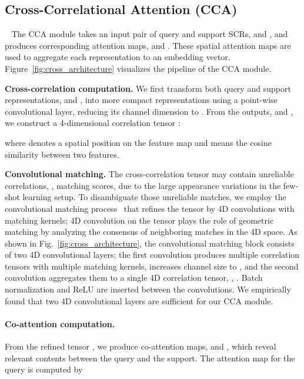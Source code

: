 \documentclass[10pt,twocolumn,letterpaper]{article}
\newcommand{\abbcross}{CCA\xspace}
\newcommand{\smallbreakparagraph}[1]{\smallbreak \noindent \textbf{#1}}
\begin{document}
\subsection{Cross-Correlational Attention (\abbcross)}~\label{sec_CCA}
The \abbcross module takes an input pair of query and support SCRs,  and , and produces corresponding attention maps,  and .
These spatial attention maps are used to aggregate each representation to an embedding vector.
Figure~\ref{fig:cross_architecture} visualizes the pipeline of the \abbcross module.








\smallbreakparagraph{Cross-correlation computation.}
We first transform both query and support representations,  and , into more compact representations using a point-wise convolutional layer, reducing its channel dimension  to .
From the outputs,  and , we construct a 4-dimensional correlation tensor :

where  denotes a spatial position on the feature map and  means the cosine similarity between two features.






\smallbreakparagraph{Convolutional matching.}
The cross-correlation tensor  may contain unreliable correlations, \ie, matching scores, due to the large appearance variations in the few-shot learning setup. 
To disambiguate those unreliable matches, we employ the convolutional matching process~\cite{ncnet,chm} that refines the tensor by 4D convolutions with  matching kernels; 4D convolution on the tensor plays the role of geometric matching by analyzing the consensus of neighboring matches in the 4D space.
As shown in Fig.~\ref{fig:cross_architecture}, the convolutional matching block  consists of two 4D convolutional layers; the first convolution produces multiple correlation tensors with multiple matching kernels, increases channel size to , and the second convolution aggregates them to a single 4D correlation tensor, \ie, . 
Batch normalization and ReLU are inserted between the convolutions.
We empirically found that two 4D convolutional layers are sufficient for our \abbcross module.











\paragraph{Co-attention computation.}
From the refined tensor , we produce co-attention maps,  and , which reveal relevant contents between the query and the support.
The attention map for the query  is computed by
\end{document}
